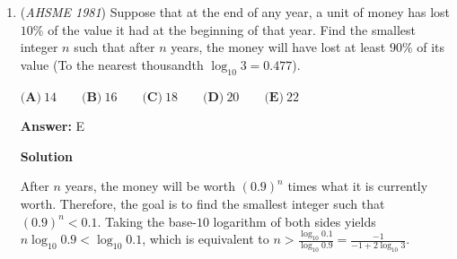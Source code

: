\begin{enumerate}
 
 \[\left(1+\frac{p}{100}\right)\left(1-\frac{q}{100}\right) > 1\]

 \[\left(\frac{100+p}{100}\right)\left(\frac{100-q}{100}\right) > 1\]

 \[\frac{(100+p)(100-q)}{10000} > 1\]

 \[100+p > \frac{10000}{100-q}\]

 \[p > \frac{10000}{100-q} - 100 = \boxed{(\textbf{E})\ \frac{100q}{100-q}}\]

 -j314andrews

 



\textbf{Solution 2 (Answer Choices)}

Choice A is incorrect. If $(M, p, q) = (100, 50, 40)$, then $p > q$, but $M$ will not increase, as $100 \cdot 1.5 \cdot 0.6 = 90$.

 Choice B is incorrect. If $(M, p, q) = (100, 50, 50)$, then $p > \frac{q}{100-q}$, but $M$ will not increase, as $100 \cdot 1.5 \cdot 0.5 = 75$.

 Choice C is incorrect. If $(M, p, q) = (100, 50, 50)$, then $p > \frac{q}{1-q}$, but $M$ will not increase, as $100 \cdot 1.5 \cdot 0.5 = 75$. 

 Choice D is incorrect. If $(M, p, q) = (100, 100, 60)$, then $p > \frac{100q}{100+q}$, but $M$ will not increase, as $100 \cdot 2 \cdot 0.4 = 80$.

 By process of elimination, $\boxed{(\textbf{E})\ \dfrac{100q}{100-q}}$ must be correct.

 -Arcticturn, edited by j314andrews

 


	\item (\textit{AHSME 1981}) Suppose that at the end of any year, a unit of money has lost $10\%$ of the value it had at the beginning of that year. Find the smallest integer $n$ such that after $n$ years, the money will have lost at least $90\%$ of its value (To the nearest thousandth $\log_{10} 3 = 0.477$).


 $\textbf{(A)}\ 14\qquad\textbf{(B)}\ 16\qquad\textbf{(C)}\ 18\qquad\textbf{(D)}\ 20\qquad\textbf{(E)}\ 22$

 \textbf{Answer: }E



\textbf{Solution}

After $n$ years, the money will be worth $(0.9)^n$ times what it is currently worth.  Therefore, the goal is to find the smallest integer such that $(0.9)^n < 0.1$.  Taking the base-$10$ logarithm of both sides yields $n \log_{10}{0.9} < \log_{10}{0.1}$, which is equivalent to $n > \frac{\log_{10}{0.1}}{\log_{10}{0.9}} = \frac{-1}{-1+2\log_{10}{3}}$. 


\end{enumerate}
